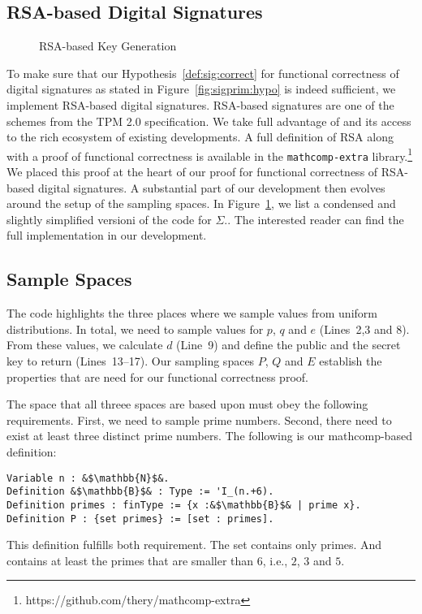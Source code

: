 \subsection{RSA-based Digital Signatures}
\label{sec:rsa}


\begin{figure}
    \centering
    
    \caption{RSA-based Key Generation}
    \label{fig:rsa:keygen}
\end{figure}


%
To make sure that our Hypothesis~\ref{def:sig:correct}
for functional correctness of digital signatures as
stated in Figure~\ref{fig:sigprim:hypo} is indeed
sufficient, we implement RSA-based digital signatures.
%
RSA-based signatures are one of the schemes from the
TPM 2.0 specification.
%
We take full advantage of \ssprove and its access to the
rich ecosystem of existing developments.
%
A full definition of RSA along with a proof of
functional correctness is available in the \texttt{mathcomp-extra}
library.\footnote{https://github.com/thery/mathcomp-extra}
%
We placed this proof at the heart of our proof
for functional correctness of RSA-based digital signatures.
%
A substantial part of our development then evolves around
the setup of the sampling spaces.
%
In Figure~\ref{fig:rsa:keygen}, we list a condensed and
slightly simplified versioni of the code for 
$\Sigma$..
%
The interested reader can find the full implementation
in our \coq development.
%

\subsection{Sample Spaces}
%
The code highlights the three places where we sample
values from uniform distributions.
%
In total, we need to sample values for $p$, $q$ and $e$
(Lines~2,3 and 8).
%
From these values, we calculate $d$ (Line~9) and
define the public and the secret key to return (Lines~13--17).
%
Our sampling spaces $P$, $Q$ and $E$ establish the
properties that are need for our functional correctness
proof.

%
The space that all threee spaces are based upon must
obey the following requirements.
%
First, we need to sample prime numbers.
%
Second, there need to exist at least three distinct prime
numbers.
%
The following is our mathcomp-based definition:
%
\begin{verbatim}
Variable n : &$\mathbb{N}$&.
Definition &$\mathbb{B}$& : Type := 'I_(n.+6).
Definition primes : finType := {x :&$\mathbb{B}$& | prime x}.
Definition P : {set primes} := [set : primes].
\end{verbatim}
%
This definition fulfills both requirement.
%
The set  contains only primes.
%
And  contains at least the primes that are smaller 
than $6$, i.e., $2$, $3$ and $5$.
%

